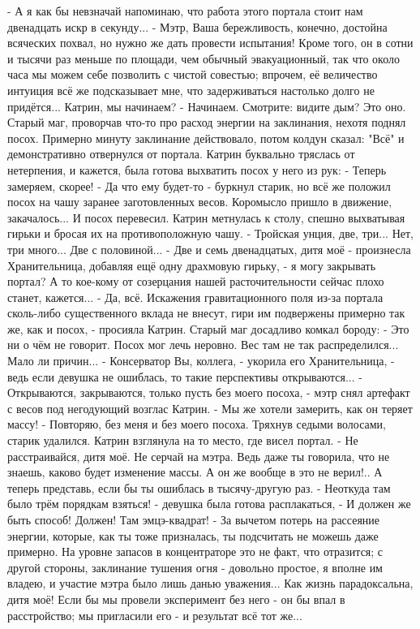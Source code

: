 

 - А я как бы невзначай напоминаю, что работа этого портала стоит нам двенадцать искр в секунду...
 - Мэтр, Ваша бережливость, конечно, достойна всяческих похвал, но нужно же дать провести испытания! Кроме того, он в сотни и тысячи раз меньше по площади, чем обычный эвакуационный, так что около часа мы можем себе позволить с чистой совестью; впрочем, её величество интуиция всё же подсказывает мне, что задерживаться настолько долго не придётся... Катрин, мы начинаем?
 - Начинаем. Смотрите: видите дым? Это оно.
Старый маг, проворчав что-то про расход энергии на заклинания, нехотя поднял посох. Примерно минуту заклинание действовало, потом колдун сказал: "Всё" и демонстративно отвернулся от портала. Катрин буквально тряслась от нетерпения, и кажется, была готова выхватить посох у него из рук:
 - Теперь замеряем, скорее!
 - Да что ему будет-то - буркнул старик, но всё же положил посох на чашу заранее заготовленных весов. Коромысло пришло в движение, закачалось... И посох перевесил. Катрин метнулась к столу, спешно выхватывая гирьки и бросая их на противоположную чашу.
 - Тройская унция, две, три... Нет, три много... Две с половиной...
 - Две и семь двенадцатых, дитя моё - произнесла Хранительница, добавляя ещё одну драхмовую гирьку, - я могу закрывать портал? А то кое-кому от созерцания нашей расточительности сейчас плохо станет, кажется...
 - Да, всё. Искажения гравитационного поля из-за портала сколь-либо существенного вклада не внесут, гири им подвержены примерно так же, как и посох, - просияла Катрин.
Старый маг досадливо комкал бороду:
 - Это ни о чём не говорит. Посох мог лечь неровно. Вес там не так распределился... Мало ли причин...
 - Консерватор Вы, коллега, - укорила его Хранительница, - ведь если девушка не ошиблась, то такие перспективы открываются...
 - Открываются, закрываются, только пусть без моего посоха, - мэтр снял артефакт с весов под негодующий возглас Катрин.
 - Мы же хотели замерить, как он теряет массу!
 - Повторяю, без меня и без моего посоха.
Тряхнув седыми волосами, старик удалился. Катрин взглянула на то место, где висел портал.
 - Не расстраивайся, дитя моё. Не серчай на мэтра. Ведь даже ты говорила, что не знаешь, каково будет изменение массы. А он же вообще в это не верил!.. А теперь представь, если бы ты ошиблась в тысячу-другую раз.
 - Неоткуда там было трём порядкам взяться! - девушка была готова расплакаться, - И должен же быть способ! Должен! Там эмцэ-квадрат!
 - За вычетом потерь на рассеяние энергии, которые, как ты тоже призналась, ты подсчитать не можешь даже примерно. На уровне запасов в концентраторе это не факт, что отразится; с другой стороны, заклинание тушения огня - довольно простое, я вполне им владею, и участие мэтра было лишь данью уважения... Как жизнь парадоксальна, дитя моё! Если бы мы провели эксперимент без него - он бы впал в расстройство; мы пригласили его - и результат всё тот же...

